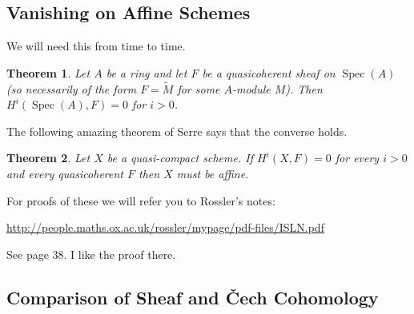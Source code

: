 \documentclass[12pt]{article}
\numberwithin{equation}{section}
\newtheorem{theorem}{Theorem}[subsection]
\theoremstyle{definition}
\theoremstyle{remark}
\newcommand{\Spec}{\operatorname{Spec}}
\begin{document}
\subsection{Vanishing on Affine Schemes}
We will need this from time to time. 
\begin{theorem}
	Let $A$ be a ring and let $F$ be a quasicoherent sheaf on $\Spec(A)$ (so necessarily of the form $F=\widetilde{M}$ for some $A$-module $M$).
	Then $H^i(\Spec(A),F)= 0$ for $i>0$.
\end{theorem}

The following amazing theorem of Serre says that the converse holds.  
\begin{theorem}
	 Let $X$ be a quasi-compact scheme. If $H^i(X,F)=0$ for every $i>0$ and every quasicoherent $F$ then $X$ must be affine. 
\end{theorem}

For proofs of these we will refer you to Rossler's notes:
\begin{center}
\url{http://people.maths.ox.ac.uk/rossler/mypage/pdf-files/ISLN.pdf}
\end{center}
See page 38. I like the proof there. 

\subsection{Comparison of Sheaf and \v{C}ech Cohomology}
\end{document}
